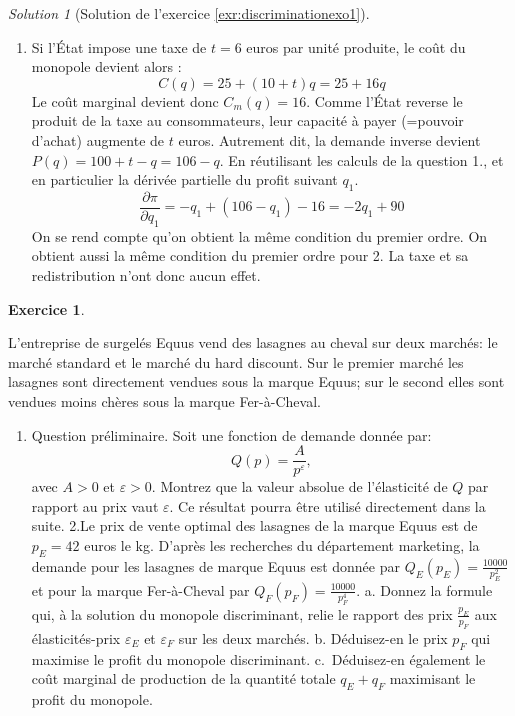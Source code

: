 \documentclass[
]{book}
\providecommand{\tightlist}{%
  \setlength{\itemsep}{0pt}\setlength{\parskip}{0pt}}
\theoremstyle{definition}
\theoremstyle{definition}
\theoremstyle{definition}
\newtheorem{exercise}{Exercice}[chapter]
\theoremstyle{definition}
\theoremstyle{remark}
\newtheorem*{solution}{Solution}
\begin{document}
\begin{solution}[Solution de l'exercice \ref{exr:discriminationexo1}]
\begin{enumerate}
\def\labelenumi{\arabic{enumi}.}
\setcounter{enumi}{2}
\tightlist
\item
  Si l'État impose une taxe de \(t=6\) euros par unité produite, le coût du monopole devient alors :
  \[C(q)=25+(10+t)q=25+16q\]
  Le coût marginal devient donc \(C_m(q)=16\).
  Comme l'État reverse le produit de la taxe au consommateurs, leur capacité à payer (=pouvoir d'achat) augmente de \(t\) euros.
  Autrement dit, la demande inverse devient \(P(q)=100+t-q=106-q\).
  En réutilisant les calculs de la question 1., et en particulier la dérivée partielle du profit suivant \(q_1\).
  \[\frac{\partial \pi}{\partial q_1}=-q_1+(106-q_1)-16=-2q_1+90\]
  On se rend compte qu'on obtient la même condition du premier ordre.
  On obtient aussi la même condition du premier ordre pour 2.
  La taxe et sa redistribution n'ont donc aucun effet.
\end{enumerate}

\end{solution}

\begin{exercise}
\protect\hypertarget{exr:discriminationexo2}{}\label{exr:discriminationexo2}

L'entreprise de surgelés Equus vend des lasagnes au cheval sur deux marchés: le marché standard et le marché du hard discount. Sur le premier marché les lasagnes sont directement vendues sous la marque Equus; sur le second elles sont vendues moins chères sous la marque Fer-à-Cheval.

\begin{enumerate}
\def\labelenumi{\arabic{enumi}.}
\tightlist
\item
  Question préliminaire. Soit une fonction de demande donnée par:
  \[Q(p)=\frac{A}{p^\varepsilon},\] avec \(A>0\) et \(\varepsilon >0\). Montrez que la valeur absolue de l'élasticité de \(Q\) par rapport au prix vaut \(\varepsilon\). Ce résultat pourra être utilisé directement dans la suite.
  2.Le prix de vente optimal des lasagnes de la marque Equus est de \(p_E=42\) euros le kg. D'après les recherches du département marketing, la demande pour les lasagnes de marque Equus est donnée par \(Q_E(p_E)=\frac{10000}{p_E^2}\) et pour la marque Fer-à-Cheval par \(Q_F(p_F)=\frac{10000}{p_F^4}\).
  a. Donnez la formule qui, à la solution du monopole discriminant, relie le rapport des prix \(\frac{p_E}{p_F}\) aux élasticités-prix \(\varepsilon_E\) et \(\varepsilon_F\) sur les deux marchés.
  b. Déduisez-en le prix \(p_F\) qui maximise le profit du monopole discriminant.
  c.~Déduisez-en également le coût marginal de production de la quantité totale \(q_E+q_F\) maximisant le profit du monopole.
\end{enumerate}

\end{exercise}
\end{document}
